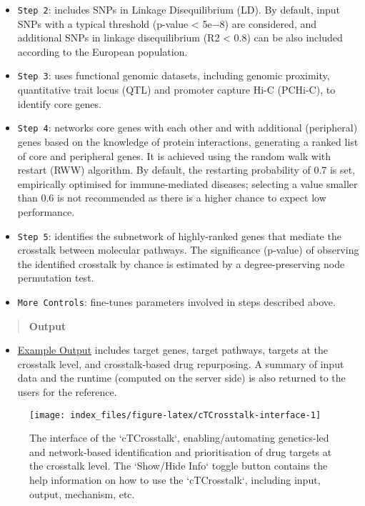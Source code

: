 \documentclass[
  oneside]{book}
\providecommand{\tightlist}{%
  \setlength{\itemsep}{0pt}\setlength{\parskip}{0pt}}
\begin{document}
\begin{itemize}
\item
  \texttt{Step\ 2}: includes SNPs in Linkage Disequilibrium (LD). By default, input SNPs with a typical threshold (p-value \textless{} 5e−8) are considered, and additional SNPs in linkage disequilibrium (R2 \textless{} 0.8) can be also included according to the European population.
\item
  \texttt{Step\ 3}: uses functional genomic datasets, including genomic proximity, quantitative trait locus (QTL) and promoter capture Hi-C (PCHi-C), to identify core genes.
\item
  \texttt{Step\ 4}: networks core genes with each other and with additional (peripheral) genes based on the knowledge of protein interactions, generating a ranked list of core and peripheral genes. It is achieved using the random walk with restart (RWW) algorithm. By default, the restarting probability of 0.7 is set, empirically optimised for immune-mediated diseases; selecting a value smaller than 0.6 is not recommended as there is a higher chance to expect low performance.
\item
  \texttt{Step\ 5}: identifies the subnetwork of highly-ranked genes that mediate the crosstalk between molecular pathways. The significance (p-value) of observing the identified crosstalk by chance is estimated by a degree-preserving node permutation test.
\item
  \texttt{More\ Controls}: fine-tunes parameters involved in steps described above.
\end{itemize}

\begin{quote}
\textbf{Output}
\end{quote}

\begin{itemize}
\tightlist
\item
  \href{/app/examples/_tmp_RMD_cTCrosstalk.html}{Example Output} includes target genes, target pathways, targets at the crosstalk level, and crosstalk-based drug repurposing. A summary of input data and the runtime (computed on the server side) is also returned to the users for the reference.
\end{itemize}

\begin{figure}

{\centering \texttt{[image: index\_files/figure-latex/cTCrosstalk-interface-1]} 

}

\caption{The interface of the `cTCrosstalk`, enabling/automating genetics-led and network-based identification and prioritisation of drug targets at the crosstalk level. The `Show/Hide Info` toggle button contains the help information on how to use the `cTCrosstalk`, including input, output, mechanism, etc.}\label{fig:cTCrosstalk-interface}
\end{figure}
\end{document}
